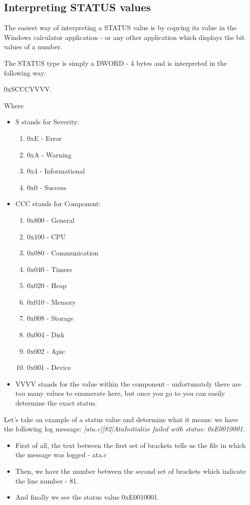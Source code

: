 \begin{appendices}
\subsection{Interpreting STATUS values}

The easiest way of interpreting a STATUS value is by copying its value in the Windows
calculator application - or any other application which displays the bit values of a number.

The STATUS type is simply a DWORD - 4 bytes and is interpreted in the following
way:

0x{\color{blue}S}{\color{purple}CCC}{\color{green}VVVV}.

Where

\begin{itemize}
	\item S stands for Severity:
		\begin{enumerate}
			\item 0xE - Error
			\item 0xA - Warning
			\item 0x4 - Informational
			\item 0x0 - Success
		\end{enumerate}

	\item CCC stands for Component:
		\begin{enumerate}
			\item 0x800 - General
			\item 0x100 - CPU
			\item 0x080 - Communication
			\item 0x040 - Timers
			\item 0x020 - Heap
			\item 0x010 - Memory
			\item 0x008 - Storage
			\item 0x004 - Disk
			\item 0x002 - Apic
			\item 0x001 - Device
		\end{enumerate}
		
	\item VVVV stands for the value within the component - unfortunately there are too many values
	to enumerate here, but once you go to  you can easily determine the exact status.
\end{itemize}

Let's take an example of a status value and determine what it means: we have the following
log message: \textit{[ata.c][82]AtaInitialize failed with status: 0xE0010001}.
\begin{itemize}
	\item First of all, the text between the first set of brackets tells us the file in which the
message was logged - ata.c
	\item Then, we have the number between the second set of brackets which indicate the line number
- 81.
	\item And finally we see the status value 0x{\color{blue}E}{\color{purple}001}{\color{green}0001}.


\end{itemize}
\end{appendices}
